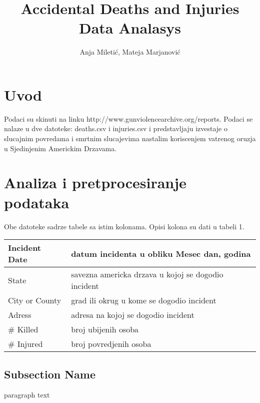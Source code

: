 \documentclass[11pt]{article} %
\title{Accidental Deaths and Injuries Data Analasys}
\author{Anja Miletić, Mateja Marjanović}
\begin{document}
	\maketitle
	\newpage

	\doublespacing
	\tableofcontents
	\singlespacing
	\newpage


	\section{Uvod}
	Podaci su skinuti na linku http://www.gunviolencearchive.org/reports. Podaci se nalaze u dve datoteke: deaths.csv i injuries.csv i predstavljaju izvestaje o 
	slucajnim povredama i smrtnim slucajevima nastalim koriscenjem vatrenog oruzja u Sjedinjenim Americkim Drzavama. 

	\section{Analiza i pretprocesiranje podataka}
	Obe datoteke sadrze tabele sa istim kolonama. Opisi kolona su dati u tabeli 1.
	\newline\newline
	\begin{tabular}{|l|l|}
	\hline
	Incident Date & datum incidenta u obliku Mesec dan, godina \\
	\hline
	State & savezna americka drzava u kojoj se dogodio incident \\
	\hline
	City or County & grad ili okrug u kome se dogodio incident \\
	\hline
	Adress & adresa na kojoj se dogodio incident \\
	\hline
	\# Killed & broj ubijenih osoba \\
	\hline
	\# Injured & broj povredjenih osoba \\
	\hline
	\end{tabular}
	\subsection{Subsection Name}
	paragraph text
\end{document}
